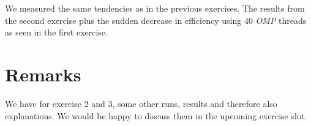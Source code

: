 \documentclass[a4paper,11pt]{article}
\theoremstyle{mytheor}
\begin{document}
We measured the same tendencies as in the previous exercises. The results from the second exercise plus the sudden decrease in efficiency using 40 \emph{OMP} threads as seen in the first exercise.

\section*{Remarks}
We have for exercise 2 and 3, some other runs, results and therefore also explanations. We would be happy to discuss them in the upcoming exercise slot.
\end{document}
